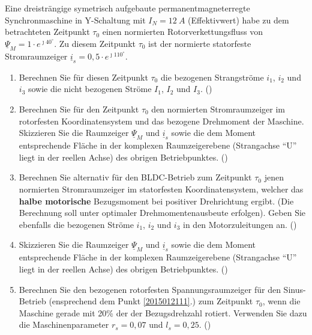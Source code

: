 \begin{question}[topic=psm,type=exam,tags={20150121}]
Eine dreisträngige symetrisch aufgebaute permanentmagneterregte Synchronmaschine in Y-Schaltung mit $I_N = 12~A$ (Effektivwert) habe zu dem betrachteten Zeitpunkt $\tau_0$ einen normierten Rotorverkettungsfluss von $\underline{\Psi}_M = 1 \cdot e^{\jmath 40 ^\circ}$. Zu diesem Zeitpunkt $\tau_0$ ist der normierte statorfeste Stromraumzeiger $\underline{i}_s = 0,5 \cdot e^{\jmath 110 ^\circ}$.
\begin{enumerate}
\item Berechnen Sie für diesen Zeitpunkt $\tau_0$ die bezogenen Strangströme $i_1$, $i_2$ und $i_3$ sowie die nicht bezogenen Ströme $I_1$, $I_2$ und $I_3$. ()\label{2015012111}
\item Berechnen Sie für den Zeitpunkt $\tau_0$ den normierten Stromraumzeiger im rotorfesten Koordinatensystem und das bezogene Drehmoment der Maschine. Skizzieren Sie die Raumzeiger $\underline{\Psi}_M$ und $\underline{i}_s$ sowie die dem Moment entsprechende Fläche in der komplexen Raumzeigerebene (Strangachse ``U'' liegt in der reellen Achse) des obrigen Betriebpunktes. ()
\item Berechnen Sie alternativ für den BLDC-Betrieb zum Zeitpunkt $\tau_0$ jenen normierten Stromraumzeiger im statorfesten Koordinatensystem, welcher das \textbf{halbe motorische} Bezugsmoment bei positiver Drehrichtung ergibt. (Die Berechnung soll unter optimaler Drehmomentenausbeute erfolgen). Geben Sie ebenfalls die bezogenen Ströme $i_1$, $i_2$ und $i_3$ in den Motorzuleitungen an. ()
\item Skizzieren Sie die Raumzeiger $\underline{\Psi}_M$ und $\underline{i}_s$ sowie die dem Moment entsprechende Fläche in der komplexen Raumzeigerebene (Strangachse ``U'' liegt in der reellen Achse) des obrigen Betriebpunktes. ()
\item Berechnen Sie den bezogenen rotorfesten Spannungsraumzeiger für den Sinus-Betrieb (ensprechend dem Punkt \ref{2015012111}.) zum Zeitpunkt $\tau_0$, wenn die Maschine gerade mit 20\% der der Bezugsdrehzahl rotiert. Verwenden Sie dazu die Maschinenparameter $r_s = 0,07$ und $l_s= 0,25$. ()
\end{enumerate}
\end{question}
